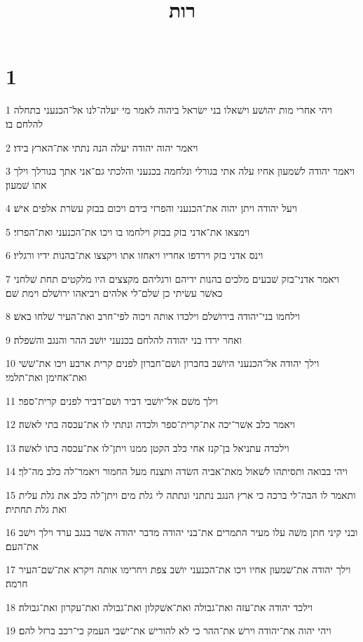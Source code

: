 

\title{רות}


\chapter{1}

\par 1 ויהי אחרי מות יהושׁע וישׁאלו בני ישׂראל ביהוה לאמר מי יעלה־לנו אל־הכנעני בתחלה להלחם בו׃
\par 2 ויאמר יהוה יהודה יעלה הנה נתתי את־הארץ בידו׃
\par 3 ויאמר יהודה לשׁמעון אחיו עלה אתי בגורלי ונלחמה בכנעני והלכתי גם־אני אתך בגורלך וילך אתו שׁמעון׃
\par 4 ויעל יהודה ויתן יהוה את־הכנעני והפרזי בידם ויכום בבזק עשׂרת אלפים אישׁ׃
\par 5 וימצאו את־אדני בזק בבזק וילחמו בו ויכו את־הכנעני ואת־הפרזי׃
\par 6 וינס אדני בזק וירדפו אחריו ויאחזו אתו ויקצצו את־בהנות ידיו ורגליו׃
\par 7 ויאמר אדני־בזק שׁבעים מלכים בהנות ידיהם ורגליהם מקצצים היו מלקטים תחת שׁלחני כאשׁר עשׂיתי כן שׁלם־לי אלהים ויביאהו ירושׁלם וימת שׁם׃
\par 8 וילחמו בני־יהודה בירושׁלם וילכדו אותה ויכוה לפי־חרב ואת־העיר שׁלחו באשׁ׃
\par 9 ואחר ירדו בני יהודה להלחם בכנעני יושׁב ההר והנגב והשׁפלה׃
\par 10 וילך יהודה אל־הכנעני היושׁב בחברון ושׁם־חברון לפנים קרית ארבע ויכו את־שׁשׁי ואת־אחימן ואת־תלמי׃
\par 11 וילך משׁם אל־יושׁבי דביר ושׁם־דביר לפנים קרית־ספר׃
\par 12 ויאמר כלב אשׁר־יכה את־קרית־ספר ולכדה ונתתי לו את־עכסה בתי לאשׁה׃
\par 13 וילכדה עתניאל בן־קנז אחי כלב הקטן ממנו ויתן־לו את־עכסה בתו לאשׁה׃
\par 14 ויהי בבואה ותסיתהו לשׁאול מאת־אביה השׂדה ותצנח מעל החמור ויאמר־לה כלב מה־לך׃
\par 15 ותאמר לו הבה־לי ברכה כי ארץ הנגב נתתני ונתתה לי גלת מים ויתן־לה כלב את גלת עלית ואת גלת תחתית׃
\par 16 ובני קיני חתן משׁה עלו מעיר התמרים את־בני יהודה מדבר יהודה אשׁר בנגב ערד וילך וישׁב את־העם׃
\par 17 וילך יהודה את־שׁמעון אחיו ויכו את־הכנעני יושׁב צפת ויחרימו אותה ויקרא את־שׁם־העיר חרמה׃
\par 18 וילכד יהודה את־עזה ואת־גבולה ואת־אשׁקלון ואת־גבולה ואת־עקרון ואת־גבולה׃
\par 19 ויהי יהוה את־יהודה וירשׁ את־ההר כי לא להורישׁ את־ישׁבי העמק כי־רכב ברזל להם׃
